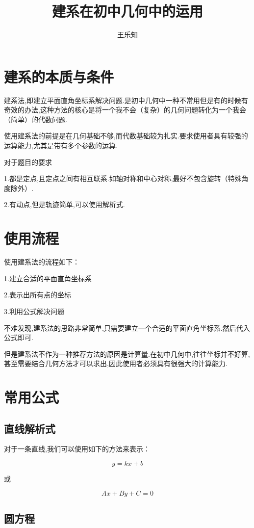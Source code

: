 \documentclass[UTF8]{ctexart}
\title{建系在初中几何中的运用}
\author{王乐知}
\begin{document}
\maketitle

\section{建系的本质与条件}

建系法,即建立平面直角坐标系解决问题.是初中几何中一种不常用但是有的时候有奇效的办法,这种方法的核心是将一个我不会（复杂）的几何问题转化为一个我会（简单）的代数问题.

使用建系法的前提是在几何基础不够,而代数基础较为扎实.要求使用者具有较强的运算能力,尤其是带有多个参数的运算.

对于题目的要求

1.都是定点,且定点之间有相互联系.如轴对称和中心对称,最好不包含旋转（特殊角度除外）.

2.有动点,但是轨迹简单,可以使用解析式.

\section{使用流程}

使用建系法的流程如下：

1.建立合适的平面直角坐标系

2.表示出所有点的坐标

3.利用公式解决问题

不难发现,建系法的思路非常简单,只需要建立一个合适的平面直角坐标系.然后代入公式即可.

但是建系法不作为一种推荐方法的原因是计算量.在初中几何中,往往坐标并不好算,甚至需要结合几何方法才可以求出,因此使用者必须具有很强大的计算能力.

\section{常用公式}

\subsection{直线解析式}

对于一条直线,我们可以使用如下的方法来表示：

\[
y=kx+b
\]

或

\[
Ax+By+C=0 
\]

\subsection{圆方程}
\end{document}
